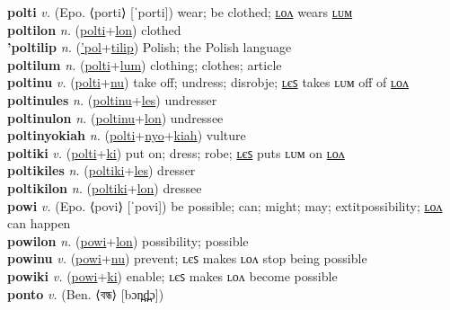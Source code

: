 \textbf{polti} \textit{v.} (Epo. ⟨porti⟩ [ˈporti])
wear; be clothed; \hyperref[poltilon]{ʟᴏᴧ} wears \hyperref[poltilum]{ʟᴜᴍ} \label{polti} \\
\textbf{poltilon} \textit{n.} (\hyperref[polti]{polti}+\hyperref[lon]{lon})
clothed \label{poltilon} \\
\textbf{'poltilip} \textit{n.} (\hyperref['pol]{'pol}+\hyperref[tilip]{tilip})
Polish; the Polish language \label{'poltilip} \\
\textbf{poltilum} \textit{n.} (\hyperref[polti]{polti}+\hyperref[lum]{lum})
clothing; clothes; article \label{poltilum} \\
\textbf{poltinu} \textit{v.} (\hyperref[polti]{polti}+\hyperref[nu]{nu})
take off; undress; disrobje; \hyperref[poltinules]{ʟєꜱ} takes ʟᴜᴍ off of \hyperref[poltinulon]{ʟᴏᴧ} \label{poltinu} \\
\textbf{poltinules} \textit{n.} (\hyperref[poltinu]{poltinu}+\hyperref[les]{les})
undresser \label{poltinules} \\
\textbf{poltinulon} \textit{n.} (\hyperref[poltinu]{poltinu}+\hyperref[lon]{lon})
undressee \label{poltinulon} \\
\textbf{poltinyokiah} \textit{n.} (\hyperref[polti]{polti}+\hyperref[nyo]{nyo}+\hyperref[kiah]{kiah})
vulture \label{poltinyokiah} \\
\textbf{poltiki} \textit{v.} (\hyperref[polti]{polti}+\hyperref[ki]{ki})
put on; dress; robe; \hyperref[poltikiles]{ʟєꜱ} puts ʟᴜᴍ on \hyperref[poltikilon]{ʟᴏᴧ} \label{poltiki} \\
\textbf{poltikiles} \textit{n.} (\hyperref[poltiki]{poltiki}+\hyperref[les]{les})
dresser \label{poltikiles} \\
\textbf{poltikilon} \textit{n.} (\hyperref[poltiki]{poltiki}+\hyperref[lon]{lon})
dressee \label{poltikilon} \\
\textbf{powi} \textit{v.} (Epo. ⟨povi⟩ [ˈpovi])
be possible; can; might; may; 	extit{possibility}; \hyperref[powilon]{ʟᴏᴧ} can happen \label{powi} \\
\textbf{powilon} \textit{n.} (\hyperref[powi]{powi}+\hyperref[lon]{lon})
possibility; possible \label{powilon} \\
\textbf{powinu} \textit{v.} (\hyperref[powi]{powi}+\hyperref[nu]{nu})
prevent; ʟєꜱ makes ʟᴏᴧ stop being possible \label{powinu} \\
\textbf{powiki} \textit{v.} (\hyperref[powi]{powi}+\hyperref[ki]{ki})
enable; ʟєꜱ makes ʟᴏᴧ become possible \label{powiki} \\
\textbf{ponto} \textit{v.} (Ben. ⟨বন্ধ⟩ [bɔn̪d̪̤ɔ])
